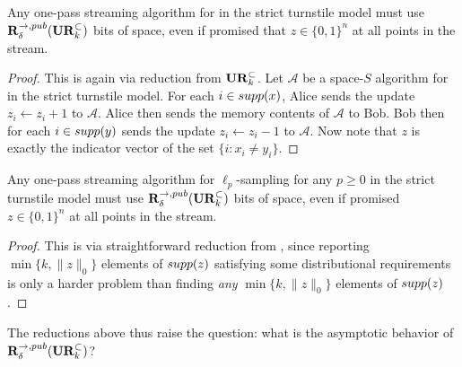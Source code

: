 \begin{claim}
Any one-pass streaming algorithm for  in the strict turnstile model must use $\mathbf{R}^{\rightarrow,pub}_{\delta}(\mathbf{UR}_k^\subset)$ bits of space, even if promised that $z\in\{0,1\}^n$ at all points in the stream.
\end{claim}
\begin{proof}
This is again via reduction from $\mathbf{UR}_k^\subset$. Let $\mathcal{A}$ be a space-$S$ algorithm for  in the strict turnstile model. For each $i\in\mathop{supp}(x)$, Alice sends the update $z_i \leftarrow z_i + 1$ to $\mathcal{A}$. Alice then sends the memory contents of $\mathcal{A}$ to Bob. Bob then for each $i\in\mathop{supp}(y)$ sends the update $z_i\leftarrow z_i - 1$ to $\mathcal{A}$. Now note that $z$ is exactly the indicator vector of the set $\{i : x_i\neq y_i\}$.
\end{proof}

\begin{claim}
Any one-pass streaming algorithm for $\ell_p$-sampling for any $p\ge 0$ in the strict turnstile model must use $\mathbf{R}^{\rightarrow,pub}_{\delta}(\mathbf{UR}_k^\subset)$ bits of space, even if promised $z\in\{0,1\}^n$ at all points in the stream.
\end{claim}
\begin{proof}
This is via straightforward reduction from , since reporting $\min\{k,\|z\|_0\}$ elements of $\mathop{supp}(z)$ satisfying some distributional requirements is only a harder problem than finding {\em any} $\min\{k,\|z\|_0\}$ elements of $\mathop{supp}(z)$.
\end{proof}



The reductions above thus raise the question: what is the asymptotic behavior of $\mathbf{R}^{\rightarrow,pub}_\delta(\mathbf{UR}_k^\subset)$?

